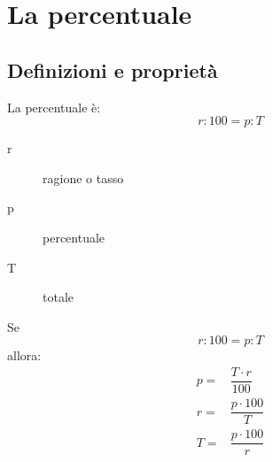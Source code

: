 \chapter{La percentuale}
\section{Definizioni e proprietà}
\begin{defn}
	La percentuale è:
	\[ r:100=p:T\]
\begin{description}
	\item[r] ragione o tasso
	\item[p] percentuale
	\item[T] totale
\end{description}
\end{defn}
\begin{thm}[Base]
	Se\[ r:100=p:T\] allora:
	\begin{align*}
	p=&\dfrac{T\cdot r}{100}\\
	r=&\dfrac{p\cdot100}{T}\\
	T=&\dfrac{p\cdot100}{r}\\
	\end{align*}
\end{thm}
